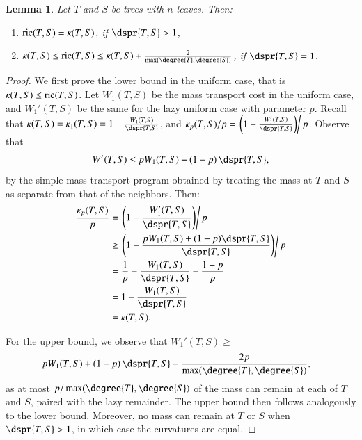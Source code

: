 \documentclass[]{elsarticle}
\newtheorem{lem}[thm]{Lemma}
\newcommand{\curvature}[2][]{%
    \ifthenelse{\equal{#1}{}}%
		{\kappa(#2)}%
		{\kappa_{#1}(#2)}%
}
\newcommand{\ric}[1]{
	\operatorname{ric}(#1)%
}
\begin{document}
\begin{lem}
\label{lem:asymptotic}
	Let $T$ and $S$ be trees with $n$ leaves.
	Then:
	\begin{enumerate}
		\item	$\ric{T,S} = \curvature{T,S}$, if $\dspr{T,S} > 1$,
		\item	$\curvature{T,S} \le \ric{T,S} \le \curvature{T,S} + \frac{2}{\max(\degree{T}, \degree{S})}$, if $\dspr{T,S} = 1$.
	\end{enumerate}
\end{lem}
\begin{proof}
	We first prove the lower bound in the uniform case, that is $\curvature{T,S} \le \ric{T,S}$.
	Let $W_1(T,S)$ be the mass transport cost in the uniform case, and $W_1'(T,S)$ be the same for the lazy uniform case with parameter $p$.
	Recall that $\curvature{T,S} = \curvature[1]{T,S} = 1 - \frac{W_1(T,S)}{\dspr{T,S}}$, and $\curvature[p]{T,S} / p = \left. \left(1 - \frac{W_1'(T,S)}{\dspr{T,S}}\right) \right/ p$.
	Observe that $$W_1'(T,S) \le pW_1(T,S) + (1-p) \, \dspr{T,S},$$ by the simple mass transport program obtained by treating the mass at $T$ and $S$ as separate from that of the neighbors.
	Then:
	\begin{align*}
		\frac{\curvature[p]{T,S}}{p} &= \left. \left(1 - \frac{W_1'(T,S)}{\dspr{T,S}}\right) \right/ p \\
		&\ge \left. \left(1 - \frac{pW_1(T,S) + (1-p)\dspr{T,S}}{\dspr{T,S}}\right) \right/ p \\
		&= \frac{1}{p} - \frac{W_1(T,S)}{\dspr{T,S}} - \frac{1-p}{p} \\
		&= 1 - \frac{W_1(T,S)}{\dspr{T,S}} \\
		&= \curvature{T,S}.
	\end{align*}

	For the upper bound, we observe that $W_1'(T,S) \ge$
	\begin{align*}
		p &W_1(T,S) + (1-p) \, \dspr{T,S} - \frac{2p}{\max(\degree{T}, \degree{S})},
	\end{align*}
	as at most $p / \max(\degree{T},\degree{S})$ of the mass can remain at each of $T$ and $S$, paired with the lazy remainder.
	The upper bound then follows analogously to the lower bound.
	Moreover, no mass can remain at $T$ or $S$ when $\dspr{T,S} > 1$, in which case the curvatures are equal.
\end{proof}
\end{document}
